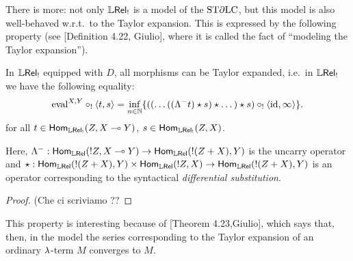 There is more: not only $\mathbb{L} \mathsf{Rel}_!$ is a model of the $\mathrm{ST}\partial\mathrm{LC}$, but this model is also well-behaved w.r.t.\ to the \lamcalc Taylor expansion.
This is expressed by the following property (see [Definition 4.22, Giulio], where it is called the fact of ``modeling the Taylor expansion'').

\begin{theorem}\label{thm:modelsTaylor}
 In $\mathbb{L} \mathsf{Rel}_!$ equipped with $D$, all morphisms can be Taylor expanded, i.e.\ in $\mathbb{L} \mathsf{Rel}_!$ we have the following equality:
 \[
  \mathrm{eval}^{X,Y}\circ_!\langle t,s\rangle =
  \inf\limits_{n\in\mathbb{N}}
  \{((\dots((\Lambda^- t)\star s)\star \dots)\star s)\circ_! \langle \mathrm{id},\infty \rangle\}.
 \]
 for all $t\in\mathsf{Hom}_{\mathbb{L} \mathsf{Rel}_!}(Z,X\multimap Y)$, $s\in\mathsf{Hom}_{\mathbb{L} \mathsf{Rel}_!}(Z,X)$.
\end{theorem}
Here, $\Lambda^-:\mathsf{Hom}_{\mathbb{L} \mathsf{Rel}}(!Z,X\multimap Y)\to \mathsf{Hom}_{\mathbb{L} \mathsf{Rel}}(!(Z+X),Y)$ is the uncarry operator and $\star:\mathsf{Hom}_{\mathbb{L} \mathsf{Rel}}(!(Z+X),Y)\times\mathsf{Hom}_{\mathbb{L} \mathsf{Rel}}(!Z,X)\to \mathsf{Hom}_{\mathbb{L} \mathsf{Rel}}(!(Z+X),Y)$ is an operator corresponding to the syntactical \emph{differential substitution}.
\begin{proof}
 {\color{red}(Che ci scriviamo ??}
\end{proof}

This property is interesting because of [Theorem 4.23,Giulio], which says that, then, in the model the series corresponding to the Taylor expansion of an ordinary $\lambda$-term $M$ converges to $M$.
